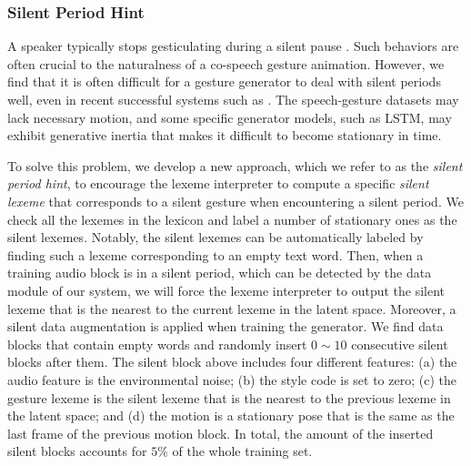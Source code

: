 \subsubsection{Silent Period Hint}
A speaker typically stops gesticulating during a silent pause \cite{graziano2018silence}. Such behaviors are often crucial to the naturalness of a co-speech gesture animation. However, we find that it is often difficult for a gesture generator to deal with silent periods well, even in recent successful systems such as \cite{alexanderson2020style,kucherenko2020gesticulator}. The speech-gesture datasets may lack necessary motion, and some specific generator models, such as LSTM, may exhibit generative inertia that makes it difficult to become stationary in time.

To solve this problem, we develop a new approach, which we refer to as the \emph{silent period hint}, to encourage the lexeme interpreter to compute a specific \emph{silent lexeme} that corresponds to a silent gesture when encountering a silent period. 
We check all the lexemes in the lexicon and label a number of stationary ones as the silent lexemes. Notably, the silent lexemes can be automatically labeled by finding such a lexeme corresponding to an empty text word. Then, when a training audio block is in a silent period, which can be detected by the data module of our system, we will force the lexeme interpreter to output the silent lexeme that is the nearest to the current lexeme in the latent space.
Moreover, a silent data augmentation is applied when training the generator. We find data blocks that contain empty words and randomly insert $0\sim{}10$ consecutive silent blocks after them. The silent block above includes four different features: (a) the audio feature is the environmental noise; (b) the style code is set to zero; (c) the gesture lexeme is the silent lexeme that is the nearest to the previous lexeme in the latent space; and (d) the motion is a stationary pose that is the same as the last frame of the previous motion block. In total, the amount of the inserted silent blocks accounts for $5\%$ of the whole training set.